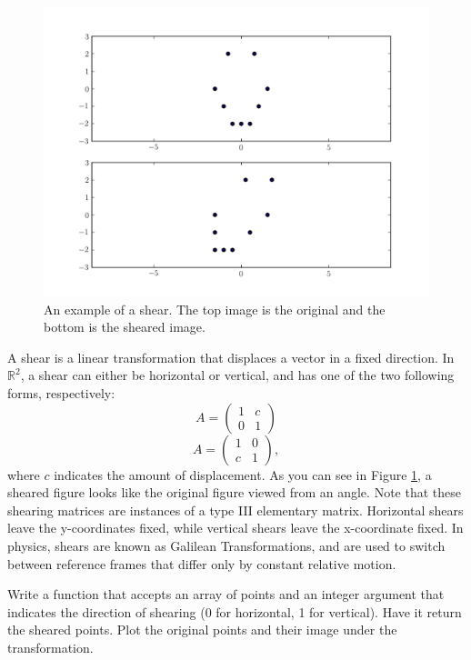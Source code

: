 \begin{figure}
\centering
\includegraphics[width=\textwidth]{shear.pdf}
\caption{An example of a shear.
The top image is the original and the bottom is the sheared image.}
\label{basis:shear}
\end{figure}

A shear is a linear transformation that displaces a vector in a fixed direction.
In $\mathbb{R}^2$, a shear can either be horizontal or vertical, and has one of
the two following forms, respectively:
\[
A = \begin{pmatrix}
1 & c \\
0 & 1
\end{pmatrix}
\]
\[
A = \begin{pmatrix}
1 & 0 \\
c & 1
\end{pmatrix},
\]
where $c$ indicates the amount of displacement. As you can see in Figure \ref{basis:shear},
a sheared figure looks like the original figure viewed from an angle. Note that
these shearing matrices are instances of a type III elementary matrix. Horizontal
shears leave the y-coordinates fixed, while vertical shears leave the x-coordinate
fixed. In physics, shears are known as Galilean Transformations, and are used
to switch between reference frames that differ only by constant relative motion.

\begin{problem}
Write a function that accepts an array of points and an integer argument
that indicates the direction of shearing (0 for horizontal, 1 for vertical).
Have it return the sheared points.
Plot the original points and their image under the transformation.
\end{problem}

